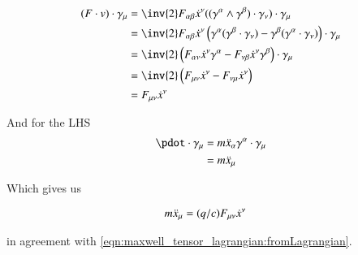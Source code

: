 \begin{align*}
(F \cdot v) \cdot \gamma_\mu 
&= \inv{2} F_{\alpha\beta} \xdot^\nu ((\gamma^{\alpha} \wedge \gamma^{\beta}) \cdot \gamma_\nu) \cdot \gamma_\mu \\
&= \inv{2} F_{\alpha\beta} \xdot^\nu \left( \gamma^{\alpha} (\gamma^{\beta} \cdot \gamma_\nu) -\gamma^{\beta} (\gamma^{\alpha} \cdot \gamma_\nu) \right) \cdot \gamma_\mu \\
&= \inv{2} \left( F_{\alpha\nu} \xdot^\nu \gamma^{\alpha} - F_{\nu\beta} \xdot^\nu \gamma^{\beta} \right) \cdot \gamma_\mu \\
&= \inv{2} \left( F_{\mu\nu} \xdot^\nu - F_{\nu\mu} \xdot^\nu \right) \\
&= F_{\mu\nu} \xdot^\nu \\
\end{align*}

And for the LHS
\begin{align*}
\pdot \cdot \gamma_\mu &= m \xddot_\alpha \gamma^\alpha \cdot \gamma_\mu \\
&= m \xddot_\mu 
\end{align*}

Which gives us

\begin{align}
m \ddot{x}_\mu &= (q/c) F_{\mu\nu} \dot{x}^\nu
\end{align}

in agreement with \ref{eqn:maxwell_tensor_lagrangian:fromLagrangian}.
